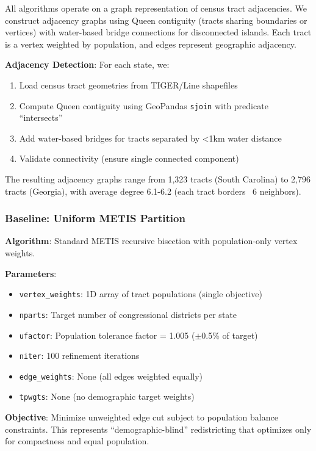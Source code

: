 All algorithms operate on a graph representation of census tract adjacencies. We construct adjacency graphs using Queen contiguity (tracts sharing boundaries or vertices) with water-based bridge connections for disconnected islands. Each tract is a vertex weighted by population, and edges represent geographic adjacency.

\textbf{Adjacency Detection}: For each state, we:
\begin{enumerate}
    \item Load census tract geometries from TIGER/Line shapefiles
    \item Compute Queen contiguity using GeoPandas \texttt{sjoin} with predicate ``intersects''
    \item Add water-based bridges for tracts separated by <1km water distance
    \item Validate connectivity (ensure single connected component)
\end{enumerate}

The resulting adjacency graphs range from 1,323 tracts (South Carolina) to 2,796 tracts (Georgia), with average degree 6.1-6.2 (each tract borders ~6 neighbors).

\subsubsection{Baseline: Uniform METIS Partition}

\textbf{Algorithm}: Standard METIS recursive bisection with population-only vertex weights.

\textbf{Parameters}:
\begin{itemize}
    \item \texttt{vertex\_weights}: 1D array of tract populations (single objective)
    \item \texttt{nparts}: Target number of congressional districts per state
    \item \texttt{ufactor}: Population tolerance factor = 1.005 ($\pm$0.5\% of target)
    \item \texttt{niter}: 100 refinement iterations
    \item \texttt{edge\_weights}: None (all edges weighted equally)
    \item \texttt{tpwgts}: None (no demographic target weights)
\end{itemize}

\textbf{Objective}: Minimize unweighted edge cut subject to population balance constraints. This represents ``demographic-blind'' redistricting that optimizes only for compactness and equal population.

